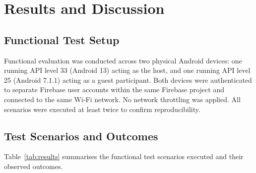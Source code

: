 \documentclass[pdflatex,sn-mathphys-num,iicol]{sn-jnl}
\theoremstyle{thmstyleone}%
\theoremstyle{thmstyletwo}%
\theoremstyle{thmstylethree}%
\begin{document}


\section{Results and Discussion}\label{sec:results}

\subsection{Functional Test Setup}

Functional evaluation was conducted across two physical Android devices: one running
API level 33 (Android 13) acting as the host, and one running API level 25
(Android 7.1.1) acting as a guest participant. Both devices were authenticated to
separate Firebase user accounts within the same Firebase project and connected to the
same Wi-Fi network. No network throttling was applied. All scenarios were executed
at least twice to confirm reproducibility.

\subsection{Test Scenarios and Outcomes}

Table~\ref{tab:results} summarises the functional test scenarios executed and their
observed outcomes.
\end{document}
